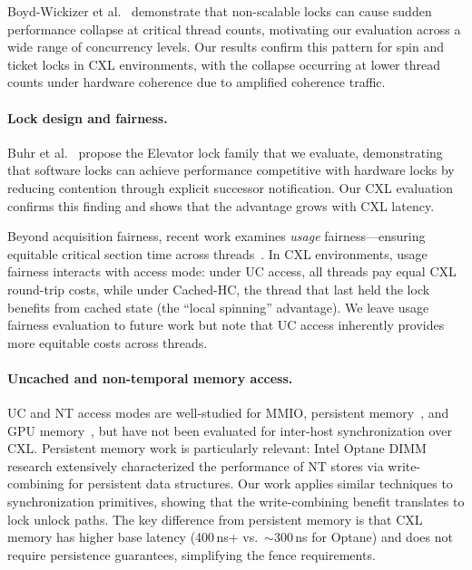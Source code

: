 Boyd-Wickizer et al.~\cite{boyd-wickizerNonscalableLocksAre} demonstrate that non-scalable locks can cause sudden performance collapse at critical thread counts, motivating our evaluation across a wide range of concurrency levels.
Our results confirm this pattern for spin and ticket locks in CXL environments, with the collapse occurring at lower thread counts under hardware coherence due to amplified coherence traffic.

\paragraph{Lock design and fairness.}
Buhr et al.~\cite{buhrHighcontentionMutualExclusion2018} propose the Elevator lock family that we evaluate, demonstrating that software locks can achieve performance competitive with hardware locks by reducing contention through explicit successor notification.
Our CXL evaluation confirms this finding and shows that the advantage grows with CXL latency.

Beyond acquisition fairness, recent work examines \emph{usage} fairness---ensuring equitable critical section time across threads~\cite{kashyapSchedulerCooperativeLocks2020}.
In CXL environments, usage fairness interacts with access mode: under UC access, all threads pay equal CXL round-trip costs, while under Cached-HC, the thread that last held the lock benefits from cached state (the ``local spinning'' advantage).
We leave usage fairness evaluation to future work but note that UC access inherently provides more equitable costs across threads.

\paragraph{Uncached and non-temporal memory access.}
UC and NT access modes are well-studied for MMIO, persistent memory~\cite{yangOptaneMemory}, and GPU memory~\cite{wangIntelligentMultiPortMemory2008}, but have not been evaluated for inter-host synchronization over CXL.
Persistent memory work is particularly relevant: Intel Optane DIMM research extensively characterized the performance of NT stores via write-combining for persistent data structures.
Our work applies similar techniques to synchronization primitives, showing that the write-combining benefit translates to lock unlock paths.
The key difference from persistent memory is that CXL memory has higher base latency (400\,ns+ vs.\ $\sim$300\,ns for Optane) and does not require persistence guarantees, simplifying the fence requirements.
